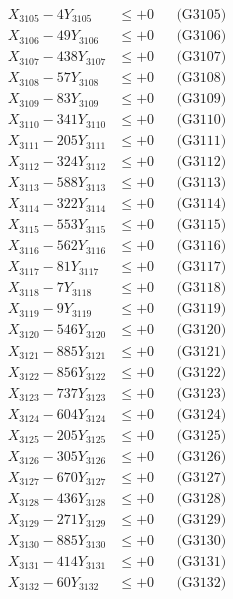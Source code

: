 \documentclass[a4paper,10pt]{article}
\begin{document}
{\begin{align}
X_{3105} - 4Y_{3105} &\leq +0 && \text{(G3105)} \\
X_{3106} - 49Y_{3106} &\leq +0 && \text{(G3106)} \\
X_{3107} - 438Y_{3107} &\leq +0 && \text{(G3107)} \\
X_{3108} - 57Y_{3108} &\leq +0 && \text{(G3108)} \\
X_{3109} - 83Y_{3109} &\leq +0 && \text{(G3109)} \\
X_{3110} - 341Y_{3110} &\leq +0 && \text{(G3110)} \\
\allowbreak
X_{3111} - 205Y_{3111} &\leq +0 && \text{(G3111)} \\
X_{3112} - 324Y_{3112} &\leq +0 && \text{(G3112)} \\
X_{3113} - 588Y_{3113} &\leq +0 && \text{(G3113)} \\
X_{3114} - 322Y_{3114} &\leq +0 && \text{(G3114)} \\
X_{3115} - 553Y_{3115} &\leq +0 && \text{(G3115)} \\
X_{3116} - 562Y_{3116} &\leq +0 && \text{(G3116)} \\
X_{3117} - 81Y_{3117} &\leq +0 && \text{(G3117)} \\
X_{3118} - 7Y_{3118} &\leq +0 && \text{(G3118)} \\
X_{3119} - 9Y_{3119} &\leq +0 && \text{(G3119)} \\
X_{3120} - 546Y_{3120} &\leq +0 && \text{(G3120)} \\
\allowbreak
X_{3121} - 885Y_{3121} &\leq +0 && \text{(G3121)} \\
X_{3122} - 856Y_{3122} &\leq +0 && \text{(G3122)} \\
X_{3123} - 737Y_{3123} &\leq +0 && \text{(G3123)} \\
X_{3124} - 604Y_{3124} &\leq +0 && \text{(G3124)} \\
X_{3125} - 205Y_{3125} &\leq +0 && \text{(G3125)} \\
X_{3126} - 305Y_{3126} &\leq +0 && \text{(G3126)} \\
X_{3127} - 670Y_{3127} &\leq +0 && \text{(G3127)} \\
X_{3128} - 436Y_{3128} &\leq +0 && \text{(G3128)} \\
X_{3129} - 271Y_{3129} &\leq +0 && \text{(G3129)} \\
X_{3130} - 885Y_{3130} &\leq +0 && \text{(G3130)} \\
\allowbreak
X_{3131} - 414Y_{3131} &\leq +0 && \text{(G3131)} \\
X_{3132} - 60Y_{3132} &\leq +0 && \text{(G3132)} \\

\end{align}}
\end{document}
